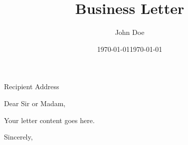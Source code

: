 \documentclass{letter}
\title{Business Letter}
\author{John Doe}
\date{\today}
\begin{document}
\maketitle

\address{Your Address}
\date{\today}

\begin{letter}{Recipient Address}
\opening{Dear Sir or Madam,}

Your letter content goes here.

\closing{Sincerely,}
\end{letter}
\end{document}
